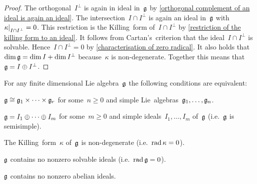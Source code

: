 \begin{proof}
  The orthogonal~$I^\perp$ is again in ideal in~$\mathfrak{g}$ by \cref{orthogonal complement of an ideal is again an ideal}.
  The intersection~$I \cap I^\perp$ is again an ideal in~$\mathfrak{g}$ with~$\restrict{\kappa}{I \cap I^\perp} = 0$.
  This restriction is the Killing~form of~$I \cap I^\perp$ by \cref{restriction of the killing form to an ideal}.
  It follows from Cartan’s~criterion that the ideal~$I \cap I^\perp$ is solvable.
  Hence~$I \cap I^\perp = 0$ by \cref{characterisation of zero radical}.
  It also holds that~$\dim \mathfrak{g} = \dim I + \dim I^\perp$ because~$\kappa$ is non-degenerate.
  Together this means that~$\mathfrak{g} = I \oplus I^\perp$.
\end{proof}


\begin{theorem}
  \label{characterizations of fd semisimple lie algebras}
  For any finite dimensional Lie algebra~$\mathfrak{g}$ the following conditions are equivalent:
  \begin{equivalenceslist}
    \item
    \label{product of simple lie algebras general}
      $\mathfrak{g} \cong \mathfrak{g}_1 \times \dotsb \times \mathfrak{g}_r$ for some~$n \geq 0$ and simple Lie~algebras~$\mathfrak{g}_1, \dotsc, \mathfrak{g}_n$.
    \item
      \label{sum of simple ideals general}
      $\mathfrak{g} = I_1 \oplus \dotsb \oplus I_m$ for some~$m \geq 0$ and simple ideals~$I_1, \dotsc, I_m$ of~$\mathfrak{g}$ (i.e.~$\mathfrak{g}$ is semisimple).
    \item
      \label{killing form is nondegenerate general}
      The Killing~form~$\kappa$ of~$\mathfrak{g}$ is non-degenerate (i.e.~$\operatorname{rad} \kappa = 0$).
    \item
      \label{contains no solvable ideal general}
      $\mathfrak{g}$ contains no nonzero solvable ideals (i.e.~$\operatorname{rad} \mathfrak{g} = 0$).
    \item
      \label{contains no abelian ideal general}
      $\mathfrak{g}$ contains no nonzero abelian ideals.
  \end{equivalenceslist}
\end{theorem}


